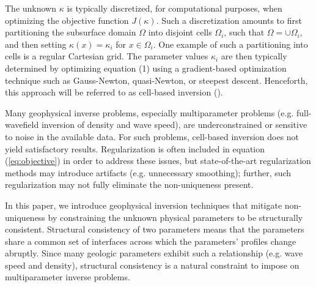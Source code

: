 \documentclass[manuscript,revised]{geophysics}
\begin{document}
The unknown $\kappa$ is typically discretized, for computational purposes, when optimizing the objective function $J\left(\kappa\right)$. Such a discretization amounts to first partitioning the subsurface domain $\Omega$ into disjoint cells $\Omega_i$, such that $\Omega = \cup\Omega_i$, and then setting $\kappa(x)=\kappa_i$ for $x \in \Omega_i$.  One example of such a partitioning into cells is a regular Cartesian grid. The parameter values ${\kappa_i}$ are then typically determined by optimizing equation (1) using a gradient-based optimization technique such as Gauss-Newton, quasi-Newton, or steepest descent. Henceforth, this approach will be referred to as cell-based inversion (\cite{Aster_2013}).

Many geophysical inverse problems, especially multiparameter problems (e.g. full-wavefield inversion of density and wave speed), are underconstrained or sensitive to noise in the available data.  For such problems, cell-based inversion does not yield satisfactory results.  Regularization is often included in equation (\ref{eq:objective}) in order to address these issues, but state-of-the-art regularization methods may introduce artifacts (e.g. unnecessary smoothing); further, such regularization may not fully eliminate the non-uniqueness present.  

In this paper, we introduce geophysical inversion techniques that mitigate non-uniqueness by constraining the unknown physical parameters to be structurally consistent.  Structural consistency of two parameters means that the parameters share a common set of interfaces across which the parameters' profiles  change abruptly.  Since many geologic parameters exhibit such a relationship (e.g. wave speed and density), structural consistency is a natural constraint to impose on multiparameter inverse problems.  
\end{document}
